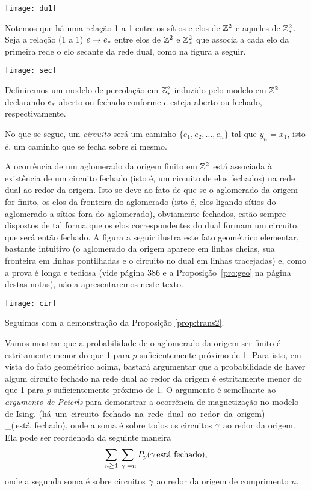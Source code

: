 \bec

%
\texttt{[image: du1]}

\eec

\vs

Notemos que há uma relação 1 a 1 entre os sítios e elos de $\mathbb{Z}^2$ e aqueles
de $\mathbb{Z}^2_\ast$. Seja a relação (1 a 1) $e\to e_\ast$ entre elos de $\mathbb{Z}^2$ e $\mathbb{Z}^2_\ast$ que associa 
a cada elo da primeira rede o elo secante da rede dual, como na figura a
seguir.

\bec
%
\texttt{[image: sec]}
\eec

Definiremos um modelo de percolação em $\mathbb{Z}^2_\ast$ induzido pelo modelo em $\mathbb{Z}^2$
declarando $e_\ast$ aberto ou fechado conforme $e$ esteja aberto ou fechado,
respectivamente.

No que se segue, um {\em circuito} será um caminho $\{e_1,e_2,\ldots,e_n\}$
tal que $y_n=x_1$, isto é, um caminho que se fecha sobre si mesmo.

A ocorrência de um aglomerado da origem finito em $\mathbb{Z}^2$ está associada à
existência de um circuito fechado (isto é, um circuito de elos fechados) na
rede dual ao redor da origem. Isto se deve ao fato de que se o aglomerado da
origem for finito, os elos da fronteira do aglomerado (isto é, elos ligando
sítios do aglomerado a sítios fora do aglomerado), obviamente fechados, estão
sempre dispostos de tal forma que os elos correspondentes do dual formam um 
circuito, que será então fechado. A figura a seguir ilustra este fato geométrico
elementar, bastante
intuitivo (o aglomerado da origem aparece em linhas cheias, sua fronteira em linhas
pontilhadas e o circuito no dual em linhas tracejadas) e, como a
prova é longa e tediosa (vide \cite{kn:K2} página 386 e
a Proposição~\ref{pro:geo} na página~\pageref{pro:geo} destas notas), 
não a apresentaremos neste texto.

\vs

\bec

%
\texttt{[image: cir]}

\eec

\vs

Seguimos com a demonstração da Proposição \ref{prop:trans2}.

Vamos mostrar que a probabilidade de o aglomerado da origem ser finito
é estritamente menor do que 1 para $p$ suficientemente próximo de 1. Para
isto, em vista do fato geométrico acima, bastará argumentar que a probabilidade
de haver algum circuito fechado na rede dual ao redor da origem é estritamente
menor do que 1 para $p$ suficientemente próximo de 1. O argumento é semelhante
ao {\em argumento de Peierls} para demonstrar a ocorrência de magnetização no
modelo de Ising.
\beqnn
\p(\mbox{há um circuito fechado na rede dual ao redor da origem})\\
\leq\sum_{\ga}\p(\ga\,\mbox{está fechado}),
\quad\quad\quad\quad\quad\quad\quad\quad\quad
\eeqnn 
onde a soma é sobre todos os circuitos $\gamma$ ao redor da origem. Ela pode ser
reordenada da seguinte maneira
$$
\sum_{n\geq4}\sum_{|\gamma|=n}P_p(\gamma\,\mbox{está fechado}),
$$
onde a segunda soma é sobre circuitos $\gamma$ ao redor da origem de comprimento $n$.

